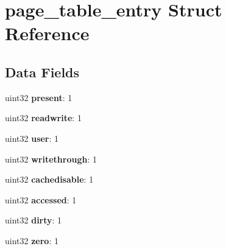 \hypertarget{structpage__table__entry}{
\section{page\_\-table\_\-entry Struct Reference}
\label{structpage__table__entry}
}
\subsection*{Data Fields}
\begin{DoxyCompactItemize}
\item 
\hypertarget{structpage__table__entry_a7c73a2f3de1a7babe69a26e424a31065}{
uint32 {\bfseries present}: 1}
\label{structpage__table__entry_a7c73a2f3de1a7babe69a26e424a31065}

\item 
\hypertarget{structpage__table__entry_a1457c1a7f180a53bf155ab22345bdc3f}{
uint32 {\bfseries readwrite}: 1}
\label{structpage__table__entry_a1457c1a7f180a53bf155ab22345bdc3f}

\item 
\hypertarget{structpage__table__entry_aeea82d617beddeec57e2c1db427e1765}{
uint32 {\bfseries user}: 1}
\label{structpage__table__entry_aeea82d617beddeec57e2c1db427e1765}

\item 
\hypertarget{structpage__table__entry_a4e5ada1bd7da1e690bc251a8012eea7d}{
uint32 {\bfseries writethrough}: 1}
\label{structpage__table__entry_a4e5ada1bd7da1e690bc251a8012eea7d}

\item 
\hypertarget{structpage__table__entry_af53099ce144da94c0674e60b6fbdfc40}{
uint32 {\bfseries cachedisable}: 1}
\label{structpage__table__entry_af53099ce144da94c0674e60b6fbdfc40}

\item 
\hypertarget{structpage__table__entry_a11b1a26c4163f9b0af1287f7f55bd95b}{
uint32 {\bfseries accessed}: 1}
\label{structpage__table__entry_a11b1a26c4163f9b0af1287f7f55bd95b}

\item 
\hypertarget{structpage__table__entry_ac4a8a89eba04d03dde9899bedaf2407e}{
uint32 {\bfseries dirty}: 1}
\label{structpage__table__entry_ac4a8a89eba04d03dde9899bedaf2407e}

\item 
\hypertarget{structpage__table__entry_a35c4fa93dda7ec37a1c1f108af267da4}{
uint32 {\bfseries zero}: 1}
\label{structpage__table__entry_a35c4fa93dda7ec37a1c1f108af267da4}


\end{DoxyCompactItemize}
